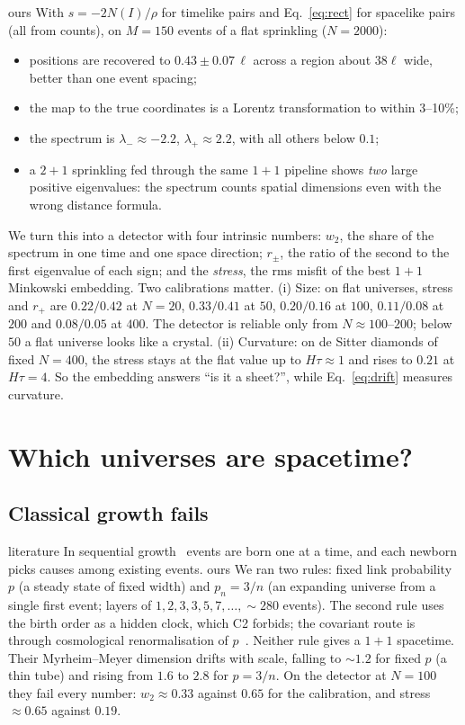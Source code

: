 \documentclass[11pt,a4paper]{article}
\newcommand{\tagbox}[2]{\textsf{\scriptsize\colorbox{#1!12}{\textcolor{#1!70!black}{#2}}}}
\newcommand{\lit}{\tagbox{blue}{literature}}
\newcommand{\ours}{\tagbox{orange}{ours}}
\begin{document}
\ours{} With $s=-2N(I)/\rho$ for timelike pairs and Eq.~\eqref{eq:rect} for spacelike pairs (all from counts), on $M=150$ events of a flat sprinkling ($N=2000$):
\begin{itemize}[leftmargin=*,itemsep=1pt]
\item positions are recovered to $0.43\pm0.07\,\ell$ across a region about $38\ell$ wide, better than one event spacing;
\item the map to the true coordinates is a Lorentz transformation to within 3--10\%;
\item the spectrum is $\lambda_-\approx-2.2$, $\lambda_+\approx2.2$, with all others below $0.1$;
\item a $2+1$ sprinkling fed through the same $1+1$ pipeline shows \emph{two} large positive eigenvalues: the spectrum counts spatial dimensions even with the wrong distance formula.
\end{itemize}
We turn this into a detector with four intrinsic numbers: $w_2$, the share of the spectrum in one time and one space direction; $r_\pm$, the ratio of the second to the first eigenvalue of each sign; and the \emph{stress}, the rms misfit of the best $1+1$ Minkowski embedding. Two calibrations matter. (i) Size: on flat universes, stress and $r_+$ are $0.22/0.42$ at $N=20$, $0.33/0.41$ at $50$, $0.20/0.16$ at $100$, $0.11/0.08$ at $200$ and $0.08/0.05$ at $400$. The detector is reliable only from $N\approx100$--$200$; below $50$ a flat universe looks like a crystal. (ii) Curvature: on de Sitter diamonds of fixed $N=400$, the stress stays at the flat value up to $H\tau\approx1$ and rises to $0.21$ at $H\tau=4$. So the embedding answers ``is it a sheet?'', while Eq.~\eqref{eq:drift} measures curvature.

\section{Which universes are spacetime?}\label{sec:which}
\subsection{Classical growth fails}
\lit{} In sequential growth~\cite{RideoutSorkin00} events are born one at a time, and each newborn picks causes among existing events. \ours{} We ran two rules: fixed link probability $p$ (a steady state of fixed width) and $p_n=3/n$ (an expanding universe from a single first event; layers of $1,2,3,3,5,7,\dots,\sim280$ events). The second rule uses the birth order as a hidden clock, which C2 forbids; the covariant route is through cosmological renormalisation of $p$~\cite{MORS01,AhmedRideout10}. Neither rule gives a $1+1$ spacetime. Their Myrheim--Meyer dimension drifts with scale, falling to $\sim1.2$ for fixed $p$ (a thin tube) and rising from $1.6$ to $2.8$ for $p=3/n$. On the detector at $N=100$ they fail every number: $w_2\approx0.33$ against $0.65$ for the calibration, and stress $\approx0.65$ against $0.19$.
\end{document}
